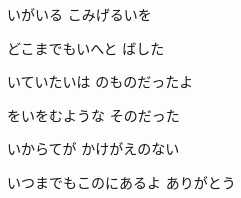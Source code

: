 \documentclass[14pt]{ltjsarticle}
\begin{document}
{  いがいる こみげるいを
  \jisho{}

  
どこまでもいへと ばした
  \jisho{}

\item
  いていたいは のものだったよ
  \jisho{}

  をいをむような そのだった
  \jisho{}

  いからてが かけがえのない
  \jisho{}

  
いつまでもこのにあるよ ありがとう
  \jisho{}

  
}
\end{document}
